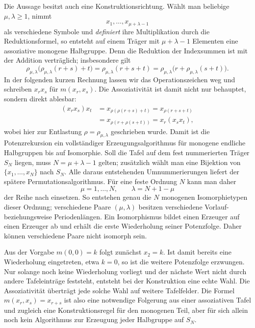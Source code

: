 \documentclass[main.tex]{subfiles}
\begin{document}
Die Aussage besitzt auch eine Konstruktionsrichtung.  Wählt man beliebige
\(\mu,\lambda\geq1\), nimmt
\[
  x_1,\ldots,x_{\mu+\lambda-1}
\]
als verschiedene Symbole und \emph{definiert} ihre Multiplikation durch die
Reduktionsformel, so entsteht auf einem Träger mit
\(\mu+\lambda-1\) Elementen eine assoziative monogene Halbgruppe.  Denn die
Reduktion der Indexsummen ist mit der Addition verträglich; insbesondere gilt
\[
  \rho_{\mu,\lambda}\!
    \bigl(\rho_{\mu,\lambda}(r+s)+t\bigr)
  =
  \rho_{\mu,\lambda}(r+s+t)
  =
  \rho_{\mu,\lambda}\!
    \bigl(r+\rho_{\mu,\lambda}(s+t)\bigr).
\]
In der folgenden kurzen Rechnung lassen wir das Operationszeichen weg und
schreiben \(x_rx_s\) für \(m(x_r,x_s)\).  Die Assoziativität ist damit nicht
nur behauptet, sondern direkt ablesbar:
\[
\begin{aligned}
  (x_r x_s)x_t
  &=x_{\rho(\rho(r+s)+t)}
   =x_{\rho(r+s+t)}\\
  &=x_{\rho(r+\rho(s+t))}
   =x_r(x_sx_t),
\end{aligned}
\]
wobei hier zur Entlastung \(\rho=\rho_{\mu,\lambda}\) geschrieben wurde.
Damit ist die Potenzrekursion ein vollständiger Erzeugungsalgorithmus für
monogene endliche Halbgruppen bis auf Isomorphie.  Soll die Tafel auf dem
fest nummerierten Träger \(S_N\) liegen, muss
\(N=\mu+\lambda-1\) gelten; zusätzlich wählt man eine Bijektion von
\(\{x_1,\ldots,x_N\}\) nach \(S_N\).  Alle daraus entstehenden
Umnummerierungen liefert der spätere Permutationsalgorithmus.  Für eine feste
Ordnung \(N\) kann man daher
\[
  \mu=1,\ldots,N,
  \qquad
  \lambda=N+1-\mu
\]
der Reihe nach einsetzen.  So entstehen genau die \(N\) monogenen
Isomorphietypen dieser Ordnung; verschiedene Paare \((\mu,\lambda)\) besitzen
verschiedene Vorlauf- beziehungsweise Periodenlängen.  Ein Isomorphismus
bildet einen Erzeuger auf einen Erzeuger ab und erhält die erste Wiederholung
seiner Potenzfolge.  Daher können verschiedene Paare nicht isomorph sein.

\begin{remark}
Aus der Vorgabe \(m(0,0)=k\) folgt zunächst \(x_2=k\).  Ist damit bereits
eine Wiederholung eingetreten, etwa \(k=0\), so ist die weitere Potenzfolge
erzwungen.  Nur solange noch keine Wiederholung vorliegt und der nächste Wert
nicht durch andere Tafeleinträge feststeht, entsteht bei der Konstruktion
eine echte Wahl.  Die Assoziativität überträgt jede solche Wahl auf weitere
Tafelfelder.  Die Formel \(m(x_r,x_s)=x_{r+s}\) ist also eine notwendige
Folgerung aus einer assoziativen Tafel und zugleich eine Konstruktionsregel
für den monogenen Teil, aber für sich allein noch kein Algorithmus zur
Erzeugung jeder Halbgruppe auf \(S_N\).
\end{remark}
\end{document}
